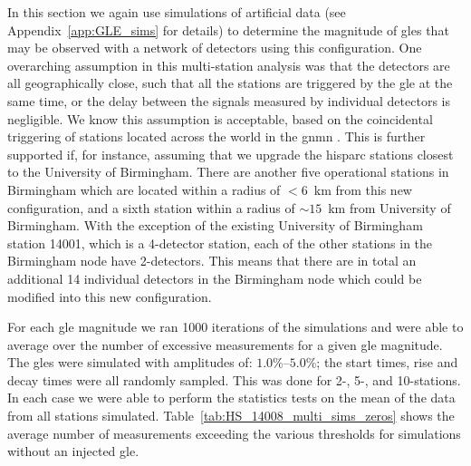 In this section we again use simulations of artificial data (see Appendix~\ref{app:GLE_sims} for details) to determine the magnitude of \glspl{gle} that may be observed with a network of detectors using this configuration. One overarching assumption in this multi-station analysis was that the detectors are all geographically close, such that all the stations are triggered by the \gls{gle} at the same time, or the delay between the signals measured by individual detectors is negligible. We know this assumption is acceptable, based on the coincidental triggering of stations located across the world in the \gls{gnmn} \citep{mishev_current_2020}. This is further supported if, for instance, assuming that we upgrade the \gls{hisparc} stations closest to the University of Birmingham. There are another five operational stations in Birmingham which are located within a radius of $<6$~km from this new configuration, and a sixth station within a radius of $\sim15$~km from University of Birmingham. With the exception of the existing University of Birmingham station 14001, which is a 4-detector station, each of the other stations in the Birmingham node have 2-detectors. This means that there are in total an additional 14 individual detectors in the Birmingham node which could be modified into this new configuration.

For each \gls{gle} magnitude we ran 1000 iterations of the simulations and were able to average over the number of excessive measurements for a given \gls{gle} magnitude. The \glspl{gle} were simulated with amplitudes of: $1.0\%$--$5.0\%$; the start times, rise and decay times were all randomly sampled. This was done for 2-, 5-, and 10-stations. In each case we were able to perform the statistics tests on the mean of the data from all stations simulated. Table~\ref{tab:HS_14008_multi_sims_zeros} shows the average number of measurements exceeding the various thresholds for simulations without an injected \gls{gle}.

\vspace{1em}

